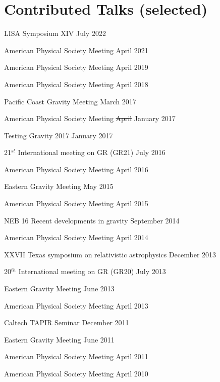 \section{\sc Contributed Talks (selected)}
\begin{etaremune}
\item
  LISA Symposium XIV
  \hfill{}
  July 2022
\item
  American Physical Society Meeting
  \hfill{}
  April 2021
\item
  American Physical Society Meeting
  \hfill{}
  April 2019
\item
  American Physical Society Meeting
  \hfill{}
  April 2018
\item
  Pacific Coast Gravity Meeting
  \hfill{}
  March 2017
\item
  American Physical Society Meeting
  \hfill{}
  \sout{April} January 2017
\item
  Testing Gravity 2017
  \hfill{}
  January 2017
\item
  21$^{st}$ International meeting on GR (GR21)
  \hfill{}
  July 2016
\item
  American Physical Society Meeting
  \hfill{}
  April 2016
\item
  Eastern Gravity Meeting
  \hfill{}
  May 2015
\item
  American Physical Society Meeting
  \hfill{}
  April 2015
\item
  NEB 16 Recent developments in gravity
  \hfill{}
  September 2014
\item
  American Physical Society Meeting
  \hfill{}
  April 2014
\item
  XXVII Texas symposium on relativistic astrophysics
  \hfill{}
  December 2013
\item
  20$^{th}$ International meeting on GR (GR20)
  \hfill{}
  July 2013
\item
  Eastern Gravity Meeting
  \hfill{}
  June 2013
\item
  American Physical Society Meeting
  \hfill{}
  April 2013
\item
  Caltech TAPIR Seminar
  \hfill{}
  December 2011
\item
  Eastern Gravity Meeting
  \hfill{}
  June 2011
\item
  American Physical Society Meeting
  \hfill{}
  April 2011
\item
  American Physical Society Meeting
  \hfill{}
  April 2010
\end{etaremune}


